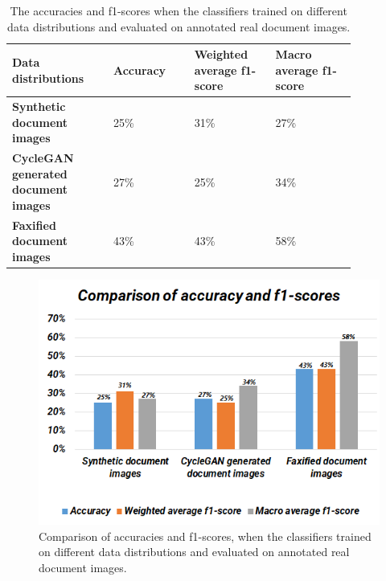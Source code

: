 \hspace*{5.0em}

\begin{table}[H]
\begin{tabular}{P{0.25\linewidth} P{0.20\linewidth} P{0.20\linewidth} P{0.20\linewidth}} 
	\toprule
	\bf{Data distributions} & \bf{Accuracy}  & \bf{Weighted average f1-score} & \bf{Macro average f1-score} \\[0.0ex] 
	\midrule
     \bf{Synthetic document images} & 25\% & 31\% & 27\%\\[0.0ex]
     \midrule
     \bf{\ac{CycleGAN} generated document images} & 27\% & 25\% & 34\%\\[0.0ex]
     \midrule
     \bf{Faxified document images} & 43\% & 43\% & 58\%\\[0.0ex]
     \bottomrule
\end{tabular}
 \caption[The accuracies and f1-scores when the classifiers trained on different data distributions and evaluated on annotated real document images.]{The accuracies and f1-scores when the classifiers trained on different data distributions and evaluated on annotated real document images.}
    \label{table:finalResults}
\end{table}


\begin{figure}[H]
        \begin{center}
	    \includegraphics[scale=0.90]{images/Evaluation/ComparisonOfAccuracyAndF1Score.png}
	    \caption[Comparison of accuracies and f1-scores, when the classifiers trained on different data distributions and evaluated on annotated real document images.]{Comparison of accuracies and f1-scores, when the classifiers trained on different data distributions and evaluated on annotated real document images.}
	    \label{fig:ComparisonOfAccuracyAndF1Score}
	    \end{center}
\end{figure}


